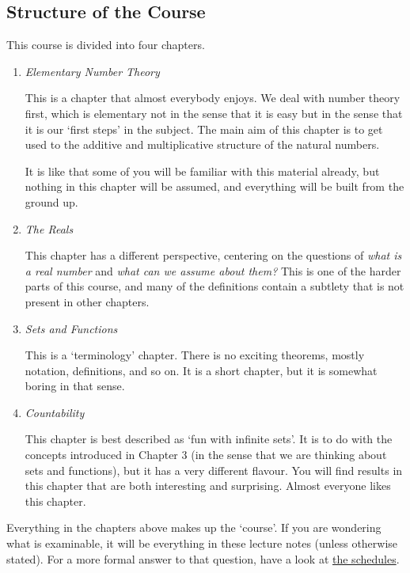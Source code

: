 \documentclass[a4]{scrartcl}
\begin{document}
\subsection{Structure of the Course}

This course is divided into four chapters.

\begin{enumerate}
	\item \emph{Elementary Number Theory}
	
	This is a chapter that almost everybody enjoys. 
	We deal with number theory first, which is elementary not in the sense that it is easy but in the sense that it is our `first steps' in the subject. The main aim of this chapter is to get used to the additive and multiplicative structure of the natural numbers.

	It is like that some of you will be familiar with this material already, but nothing in this chapter will be assumed, and everything will be built from the ground up.

	\item \emph{The Reals}
	
	This chapter has a different perspective, centering on the questions of \emph{what is a real number} and \emph{what can we assume about them?} This is one of the harder parts of this course, and many of the definitions contain a subtlety that is not present in other chapters. 

	\item \emph{Sets and Functions}
	
	This is a `terminology' chapter. There is no exciting theorems, mostly notation, definitions, and so on. It is a short chapter, but it is somewhat boring in that sense.

	\item \emph{Countability}
	
	This chapter is best described as `fun with infinite sets'. It is to do with the concepts introduced in Chapter 3 (in the sense that we are thinking about sets and functions), but it has a very different flavour. You will find results in this chapter that are both interesting and surprising. Almost everyone likes this chapter.
\end{enumerate}

Everything in the chapters above makes up the `course'. If you are wondering what is examinable, it will be everything in these lecture notes (unless otherwise stated). For a more formal answer to that question, have a look at \href{https://www.maths.cam.ac.uk/undergrad/files/schedules.pdf}{the schedules}.
\end{document}
